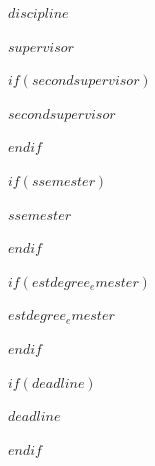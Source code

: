 \documentclass[11pt,a4paper]{article}
\begin{document}
\begin{titlepage}
  \noindent\begin{minipage}[t]{0.5\textwidth}
  \end{minipage}
  \begin{minipage}[t]{0.7\textwidth}
  \hspace{1cm}$discipline$
  \end{minipage}

  \noindent\begin{minipage}[t]{0.5\textwidth}
  \end{minipage}
  \begin{minipage}[t]{0.7\textwidth}
  \hspace{1cm}$supervisor$
  \end{minipage}

$if(secondsupervisor)$
  \noindent\begin{minipage}[t]{0.5\textwidth}
  \end{minipage}
  \begin{minipage}[t]{0.7\textwidth}
  \hspace{1cm}$secondsupervisor$
  \end{minipage}
$endif$

$if(ssemester)$
  \noindent\begin{minipage}[t]{0.5\textwidth}
  \end{minipage}
  \begin{minipage}[t]{0.7\textwidth}
  \hspace{1cm}$ssemester$
  \end{minipage}
$endif$

$if(estdegree_emester)$
  \noindent\begin{minipage}[t]{0.5\textwidth}
  \end{minipage}
  \begin{minipage}[t]{0.7\textwidth}
  \hspace{1cm}$estdegree_emester$
  \end{minipage}
$endif$

$if(deadline)$
  \noindent\begin{minipage}[t]{0.5\textwidth}
  \end{minipage}
  \begin{minipage}[t]{0.7\textwidth}
  \hspace{1cm}$deadline$
  \end{minipage}
$endif$

\end{titlepage}
\end{document}
